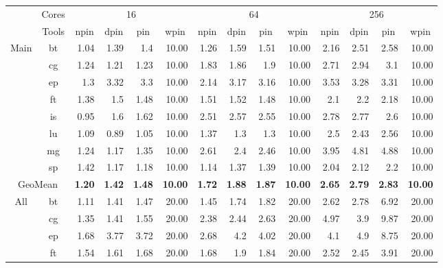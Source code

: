 \begin{tabular}{|c|c|rrrr|rrrr|rrrr|}
\hline
\multicolumn{1}{|l|}{\multirow{2}{*}{}} & Cores & \multicolumn{4}{c|}{16} & \multicolumn{4}{c|}{64} & \multicolumn{4}{c|}{256} \\ \cline{2-14} 
\multicolumn{1}{|l|}{} & Tools & \multicolumn{1}{c}{npin} & \multicolumn{1}{c}{dpin} & \multicolumn{1}{c}{pin} & \multicolumn{1}{c|}{wpin} & \multicolumn{1}{c}{npin} & \multicolumn{1}{c}{dpin} & \multicolumn{1}{c}{pin} & \multicolumn{1}{c|}{wpin} & \multicolumn{1}{c}{npin} & \multicolumn{1}{c}{dpin} & \multicolumn{1}{c}{pin} & \multicolumn{1}{c|}{wpin} \\ \cline{2-14} 
\multirow{8}{*}{Main} & bt & 1.04 & 1.39 & 1.4 & 10.00 & 1.26 & 1.59 & 1.51 & 10.00 & 2.16 & 2.51 & 2.58 & 10.00 \\
 & cg & 1.24 & 1.21 & 1.23 & 10.00 & 1.83 & 1.86 & 1.9 & 10.00 & 2.71 & 2.94 & 3.1 & 10.00 \\
 & ep & 1.3 & 3.32 & 3.3 & 10.00 & 2.14 & 3.17 & 3.16 & 10.00 & 3.53 & 3.28 & 3.31 & 10.00 \\
 & ft & 1.38 & 1.5 & 1.48 & 10.00 & 1.51 & 1.52 & 1.48 & 10.00 & 2.1 & 2.2 & 2.18 & 10.00 \\
 & is & 0.95 & 1.6 & 1.62 & 10.00 & 2.51 & 2.57 & 2.55 & 10.00 & 2.78 & 2.77 & 2.6 & 10.00 \\
 & lu & 1.09 & 0.89 & 1.05 & 10.00 & 1.37 & 1.3 & 1.3 & 10.00 & 2.5 & 2.43 & 2.56 & 10.00 \\
 & mg & 1.24 & 1.17 & 1.35 & 10.00 & 2.61 & 2.4 & 2.46 & 10.00 & 3.95 & 4.81 & 4.88 & 10.00 \\
 & sp & 1.42 & 1.17 & 1.18 & 10.00 & 1.14 & 1.37 & 1.39 & 10.00 & 2.04 & 2.12 & 2.2 & 10.00 \\ \hline
\multicolumn{2}{|c|}{GeoMean} & \textbf{1.20} & \textbf{1.42} & \textbf{1.48} & \textbf{10.00} & \textbf{1.72} & \textbf{1.88} & \textbf{1.87} & \textbf{10.00} & \textbf{2.65} & \textbf{2.79} & \textbf{2.83} & \textbf{10.00} \\ \hline
\multirow{8}{*}{All} & bt & 1.11 & 1.41 & 1.47 & 20.00 & 1.45 & 1.74 & 1.82 & 20.00 & 2.62 & 2.78 & 6.92 & 20.00 \\
 & cg & 1.35 & 1.41 & 1.55 & 20.00 & 2.38 & 2.44 & 2.63 & 20.00 & 4.97 & 3.9 & 9.87 & 20.00 \\
 & ep & 1.68 & 3.77 & 3.72 & 20.00 & 2.68 & 4.2 & 4.02 & 20.00 & 4.1 & 4.9 & 8.75 & 20.00 \\
 & ft & 1.54 & 1.61 & 1.68 & 20.00 & 1.68 & 1.9 & 1.84 & 20.00 & 2.52 & 2.45 & 3.91 & 20.00 \\

\end{tabular}
